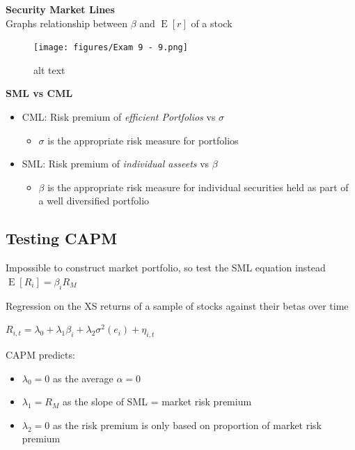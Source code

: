 \documentclass[]{book}
\providecommand{\tightlist}{%
  \setlength{\itemsep}{0pt}\setlength{\parskip}{0pt}}
\theoremstyle{definition}
\theoremstyle{definition}
\theoremstyle{remark}
\begin{document}
 \textbf{Security Market Lines}\\
Graphs relationship between \(\beta\) and \(\operatorname{E}[r]\) of a
stock

\begin{figure}[htbp]
\centering
\texttt{[image: figures/Exam 9 - 9.png]}
\caption{alt text}
\end{figure}

\textbf{SML vs CML}

\begin{itemize}
\item
  CML: Risk premium of \emph{efficient Portfolios} vs \(\sigma\)

  \begin{itemize}
  \tightlist
  \item
    \(\sigma\) is the appropriate risk measure for portfolios
  \end{itemize}
\item
  SML: Risk premium of \emph{individual asseets} vs \(\beta\)

  \begin{itemize}
  \tightlist
  \item
    \(\beta\) is the appropriate risk measure for individual securities
    held as part of a well diversified portfolio
  \end{itemize}
\end{itemize}

\subsection{Testing CAPM}\label{testing-capm}

Impossible to construct market portfolio, so test the SML equation
instead \(\operatorname{E}[R_i] = \beta_i R_M\)

Regression on the XS returns of a sample of stocks against their betas
over time

\(R_{i,t} = \lambda_0 + \lambda_1 \beta_i + \lambda_2 \sigma^2(e_i) + \eta_{i,t}\)

CAPM predicts:

\begin{itemize}
\item
  \(\lambda_0 = 0\) as the average \(\alpha = 0\)
\item
  \(\lambda_1 = R_M\) as the slope of SML = market risk premium
\item
  \(\lambda_2 = 0\) as the risk premium is only based on proportion of
  market risk premium
\end{itemize}
\end{document}
